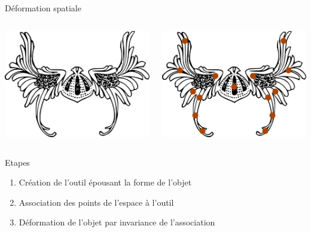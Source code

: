 \documentclass[xcolor=x11names,compress]{beamer}
\renewcommand{\(}{\begin{columns}} \renewcommand{\)}{\end{columns}}
\newcommand{\<}[1]{\begin{column}{#1}} \renewcommand{\>}{\end{column}}
\begin{document}
\begin{frame}{Déformation spatiale}
  \begin{columns}[t]
    \begin{column}{0.5\textwidth}
      \centering
      \includegraphics[scale=0.16]{Outil-Mono-Sans}
    \end{column}
    \begin{column}{0.5\textwidth}
      \centering
      \includegraphics[scale=0.16]{Outil-Mono-Points}
    \end{column}
  \end{columns}
  \begin{block}{Etapes}
    \begin{enumerate}
      \item Création de l'outil épousant la forme de l'objet
      \item Association des points de l'espace à l'outil
      \item Déformation de l'objet par invariance de l'association
    \end{enumerate}
  \end{block}
\end{frame}
\end{document}
